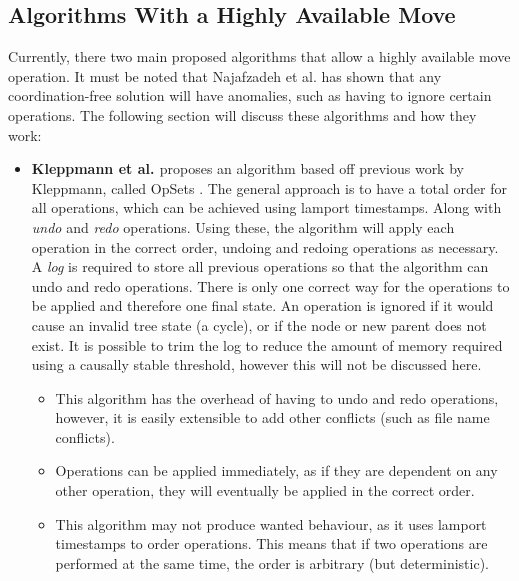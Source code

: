 \documentclass[12pt]{report}
\begin{document}
\subsection{Algorithms With a Highly Available Move} \label{sssec:algorithms}
Currently, there two main proposed algorithms that allow a highly available move operation. It must be noted that Najafzadeh et al. \cite{Najafzadeh0E18} has shown that any coordination-free solution will have anomalies, such as having to ignore certain operations. The following section will discuss these algorithms and how they work: \par
\begin{itemize}
    \item
          \textbf{Kleppmann et al. \cite{9563274}} proposes an algorithm based off previous work by Kleppmann, called OpSets \cite{https://doi.org/10.48550/arxiv.1805.04263}. The general approach is to have a total order for all operations, which can be achieved using lamport timestamps. Along with \textit{undo} and \textit{redo} operations. Using these, the algorithm will apply each operation in the correct order, undoing and redoing operations as necessary. A \textit{log} is required to store all previous operations so that the algorithm can undo and redo operations. There is only one correct way for the operations to be applied and therefore one final state. An operation is ignored if it would cause an invalid tree state (a cycle), or if the node or new parent does not exist. It is possible to trim the log to reduce the amount of memory required using a causally stable threshold, however this will not be discussed here. \par
          \begin{itemize}
            \item This algorithm has the overhead of having to undo and redo operations, however, it is easily extensible to add other conflicts (such as file name conflicts). \par
            \item Operations can be applied immediately, as if they are dependent on any other operation, they will eventually be applied in the correct order. \par
            \item This algorithm may not produce wanted behaviour, as it uses lamport timestamps to order operations. This means that if two operations are performed at the same time, the order is arbitrary (but deterministic). \par
          \end{itemize}


\end{itemize}
\end{document}
